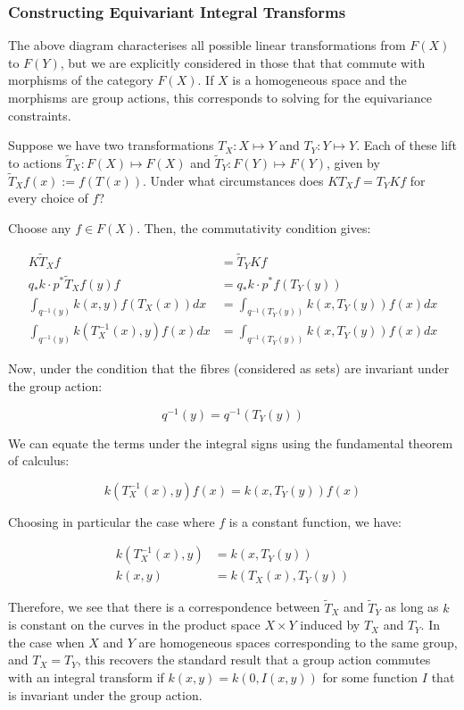 \documentclass[11pt]{article}
\begin{document}
\subsubsection*{Constructing Equivariant Integral Transforms}

The above diagram characterises all possible linear transformations from $F(X)$ to $F(Y)$, but we are explicitly considered in those that that commute with morphisms of the category $F(X)$. If $X$ is a homogeneous space and the morphisms are group actions, this corresponds to solving for the equivariance constraints.

Suppose we have two transformations $T_X: X \mapsto Y$ and $T_Y: Y \mapsto Y$. Each of these lift to actions $\tilde{T}_X: F(X) \mapsto F(X)$ and $\tilde{T}_Y: F(Y) \mapsto F(Y)$, given by $\tilde{T}_X f(x) := f(T(x))$. Under what circumstances does $K T_X f = T_Y K f$ for every choice of $f$?

Choose any $f \in F(X)$. Then, the commutativity condition gives:

\begin{align*}
  K \tilde{T}_X f &= \tilde{T}_Y K f \\
  q_* k \cdot p^*\tilde{T}_X f (y) f &= q_* k \cdot p^* f (T_Y(y)) \\
  \int_{q^{-1}(y)} k(x, y) f(T_X(x)) dx &= \int_{q^{-1}(T_Y(y))} k(x, T_Y(y)) f(x) dx \\
  \int_{q^{-1}(y)} k(T_X^{-1}(x), y) f(x) dx &= \int_{q^{-1}(T_Y(y))} k(x, T_Y(y)) f(x) dx 
\end{align*}


Now, under the condition that the fibres (considered as sets) are invariant under the group action:

$$ q^{-1}(y) = q^{-1}(T_Y(y)) $$

We can equate the terms under the integral signs using the fundamental theorem of calculus:

$$ k(T^{-1}_X(x), y) f(x) = k(x, T_Y(y)) f(x)  $$

Choosing in particular the case where $f$ is a constant function, we have:

\begin{align*}
	k(T^{-1}_X(x), y) &= k(x, T_Y(y)) \\
	k(x, y) &= k(T_X(x), T_Y(y))
\end{align*}

Therefore, we see that there is a correspondence between $\tilde{T}_X$ and $\tilde{T}_Y$ as long as $k$ is constant on the curves in the product space $X \times Y$ induced by $T_X$ and $T_Y$. In the case when $X$ and $Y$ are homogeneous spaces corresponding to the same group, and $T_X = T_Y$, this recovers the standard result that a group action commutes with an integral transform if $k(x, y) = k(0, I(x,y))$ for some function $I$ that is invariant under the group action. 
\end{document}
